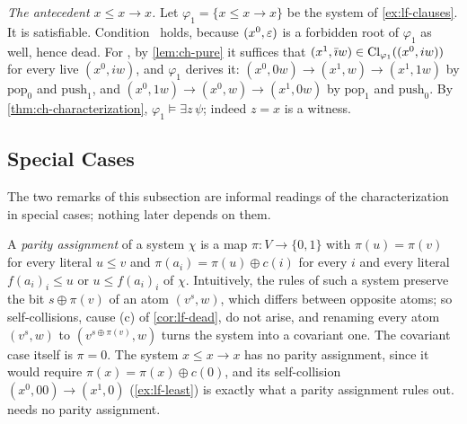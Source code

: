 \begin{example}
\emph{The antecedent $x\le x\to x$.} Let $\varphi_1=\{x\le x\to x\}$ be the
system of \cref{ex:lf-clauses}. It is satisfiable. Condition \CondU\ holds,
because $(x^0,\varepsilon)$ is a forbidden root of $\varphi_1$ as well, hence dead.
For \CondII, by \cref{lem:ch-pure} it suffices that
$(x^1,\bar\imath w)\in\operatorname{Cl}_{\varphi_1}((x^0,iw))$ for every live $(x^0,iw)$,
and $\varphi_1$ derives it: $(x^0,0w)\to(x^1,w)\to(x^1,1w)$ by $\mathrm{pop}_0$ and
$\mathrm{push}_1$, and $(x^0,1w)\to(x^0,w)\to(x^1,0w)$ by $\mathrm{pop}_1$
and $\mathrm{push}_0$. By \cref{thm:ch-characterization},
$\varphi_1\models\exists z\,\psi$; indeed $z=x$ is a witness.
\end{example}

\subsection{Special Cases}\label{sec:ch-remarks}

The two remarks of this subsection are informal readings of the
characterization in special cases; nothing later depends on them.

\begin{remark}\label{rem:ch-parity}
A \emph{parity assignment} of a system $\chi$ is a map $\pi:V\to\{0,1\}$ with
$\pi(u)=\pi(v)$ for every literal $u\le v$ and $\pi(a_i)=\pi(u)\oplus c(i)$
for every $i$ and every literal $f(a_i)_i\le u$ or $u\le f(a_i)_i$ of $\chi$.
Intuitively, the rules of such a system preserve the bit
$s\oplus\pi(v)$ of an atom $(v^s,w)$, which differs between opposite atoms;
so self-collisions, cause (c) of \cref{cor:lf-dead}, do not arise, and renaming
every atom $(v^s,w)$ to $(v^{s\oplus\pi(v)},w)$ turns the system into a
covariant one. The covariant case itself is $\pi=0$. The system $x\le x\to x$
has no parity assignment, since it would require $\pi(x)=\pi(x)\oplus c(0)$,
and its self-collision $(x^0,00)\to(x^1,0)$ (\cref{ex:lf-least}) is exactly
what a parity assignment rules out.  needs no
parity assignment.
\end{remark}

